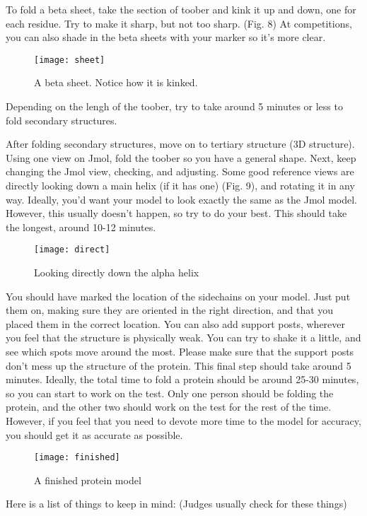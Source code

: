 \documentclass[twocolumn]{article}
\begin{document}
To fold a beta sheet, take the section of toober and kink it up and down, one for each residue. Try to make it sharp, but not too sharp. (Fig. 8) At competitions, you can also shade in the beta sheets with your marker so it's more clear. 

\begin{figure}[h!]
\caption{A beta sheet. Notice how it is kinked. }
\centering
\texttt{[image: sheet]}
\end{figure}
Depending on the lengh of the toober, try to take around 5 minutes or less to fold secondary structures. 

After folding secondary structures, move on to tertiary structure (3D structure). Using one view on Jmol, fold the toober so you have a general shape. Next, keep changing the Jmol view, checking, and adjusting. Some good reference views are directly looking down a main helix (if it has one) (Fig. 9), and rotating it in any way. Ideally, you'd want your model to look exactly the same as the Jmol model. However, this usually doesn't happen, so try to do your best. This should take the longest, around 10-12 minutes. 
\begin{figure}[h!]
\caption{Looking directly down the alpha helix}
\centering
\texttt{[image: direct]}
\end{figure}
You should have marked the location of the sidechains on your model. Just put them on, making sure they are oriented in the right direction, and that you placed them in the correct location. You can also add support posts, wherever you feel that the structure is physically weak. You can try to shake it a little, and see which spots move around the most. Please make sure that the support posts don't mess up the structure of the protein. This final step should take around 5 minutes. Ideally, the total time to fold a protein should be around 25-30 minutes, so you can start to work on the test. Only one person should be folding the protein, and the other two should work on the test for the rest of the time. However, if you feel that you need to devote more time to the model for accuracy, you should get it as accurate as possible. 
\begin{figure}[h!]
\caption{A finished protein model}
\centering
\texttt{[image: finished]}
\end{figure}
Here is a list of things to keep in mind: (Judges usually check for these things)
\end{document}
